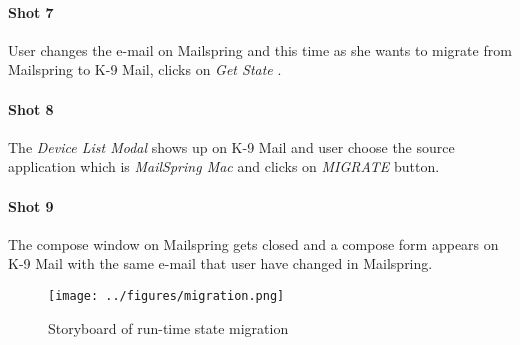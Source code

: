 \paragraph{Shot 7}
User changes the e-mail on Mailspring and this time as she wants to migrate from Mailspring to K-9 Mail, clicks on \textit{Get State} .

\paragraph{Shot 8}
The \textit{Device List Modal} shows up on K-9 Mail and user choose the source application which is \textit{MailSpring Mac} and clicks on \textit{MIGRATE} button.

\paragraph{Shot 9}
The compose window on Mailspring gets closed and a compose form appears on K-9 Mail with the same e-mail that user have changed in Mailspring.

\newpage
\FloatBarrier
\begin{sidewaysfigure}

\begin{figure}[H]
    \texttt{[image: ../figures/migration.png]}
    \centering
    \caption{Storyboard of run-time state migration}
    \label{fig:storyboard}
\end{figure}
\end{sidewaysfigure}

\FloatBarrier